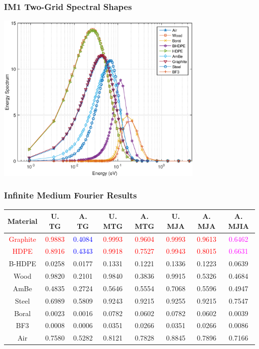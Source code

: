 \documentclass[compress,10pt]{beamer}
\newcommand{\tcr}[1]{\textcolor{red}{#1}}
\newcommand{\tcb}[1]{\textcolor{blue}{#1}}
\newcommand{\tcm}[1]{\textcolor{magenta}{#1}}
\begin{document}
\begin{frame}[t]
\frametitle{IM1 Two-Grid Spectral Shapes}
\hspace*{1.1cm}
\includegraphics[width=0.75\textwidth]{images/IM1_EC_TG.eps}
\end{frame}
\begin{frame}[t]\frametitle{Infinite Medium Fourier Results}{\small
\vspace{0.85cm}
\begin{table}
\centering
\def\arraystretch{1.2}
\begin{tabular}{|c||c|c||c|c||c|c|c|}
\hline
Material  & U. TG & A. TG & U. MTG & A. MTG & U. MJA & A. MJA & A. MJIA \\ \hline
\tcr{Graphite} & \tcr{0.9883}&\tcb{0.4084}&\tcr{0.9993}&\tcr{0.9604}&\tcr{0.9993}&\tcr{0.9613}&\tcm{0.6462}\\
\tcr{HDPE} &\tcr{0.8916}&\tcb{0.4343}&\tcr{0.9918}&\tcr{0.7527}&\tcr{0.9943}&\tcr{0.8015}&\tcm{0.6631}\\
B-HDPE &0.0258&0.0177&0.1331&0.1221&0.1336&0.1223&0.0639 \\
Wood & 0.9820&0.2101&0.9840&0.3836&0.9915&0.5326&0.4684 \\
AmBe  &0.4835&0.2724&0.5646&0.5554&0.7068&0.5596&0.4947 \\
Steel  & 0.6989&0.5809&0.9243&0.9215&0.9255&0.9215&0.7547\\
Boral  & 0.0023&0.0016&0.0782&0.0602&0.0782&0.0602&0.0039 \\
BF3   & 0.0008&0.0006&0.0351&0.0266&0.0351&0.0266&0.0086 \\
Air     &0.7580&0.5282&0.8121&0.7828&0.8845&0.7896&0.7166\\
\hline
\end{tabular}
\end{table}
}\end{frame}
\end{document}
